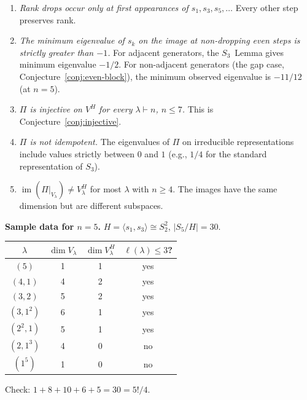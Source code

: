 \documentclass[12pt]{article}
\theoremstyle{definition}
\theoremstyle{remark}
\begin{document}
\begin{enumerate}
\item \emph{Rank drops occur only at first appearances of $s_1, s_3, s_5, \ldots$}
  Every other step preserves rank.

\item \emph{The minimum eigenvalue of $s_k$ on the image at non-dropping even steps
  is strictly greater than $-1$.}  For adjacent generators, the $S_3$~Lemma gives
  minimum eigenvalue $-1/2$.  For non-adjacent generators (the gap case,
  Conjecture~\ref{conj:even-block}), the minimum observed eigenvalue is $-11/12$
  (at $n = 5$).

\item \emph{$\Pi$ is injective on $V^H$ for every $\lambda \vdash n$, $n \le 7$.}
  This is Conjecture~\ref{conj:injective}.

\item \emph{$\Pi$ is not idempotent.}  The eigenvalues of $\Pi$ on irreducible
  representations include values strictly between $0$ and $1$ (e.g., $1/4$ for
  the standard representation of $S_3$).

\item \emph{$\operatorname{im}(\Pi|_{V_\lambda}) \neq V_\lambda^H$} for most
  $\lambda$ with $n \ge 4$.  The images have the same dimension but are different
  subspaces.
\end{enumerate}

\medskip
\noindent\textbf{Sample data for $n = 5$.}
$H = \langle s_1, s_3 \rangle \cong S_2^2$, $|S_5/H| = 30$.

\begin{center}
\begin{tabular}{c|c|c|c}
$\lambda$ & $\dim V_\lambda$ & $\dim V_\lambda^H$ & $\ell(\lambda) \le 3$? \\
\hline
$(5)$     & 1 & 1 & yes \\
$(4,1)$   & 4 & 2 & yes \\
$(3,2)$   & 5 & 2 & yes \\
$(3,1^2)$ & 6 & 1 & yes \\
$(2^2,1)$ & 5 & 1 & yes \\
$(2,1^3)$ & 4 & 0 & no \\
$(1^5)$   & 1 & 0 & no
\end{tabular}
\end{center}

\noindent
Check: $1 + 8 + 10 + 6 + 5 = 30 = 5!/4$.

\end{document}
